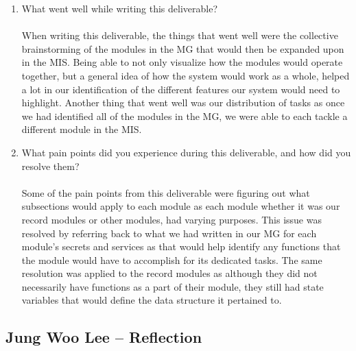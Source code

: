 \documentclass[12pt, titlepage]{article}
\begin{document}
\begin{enumerate}
  \item What went well while writing this deliverable?\\\\
  When writing this deliverable, the things that went well were the collective brainstorming
  of the modules in the MG that would then be expanded upon in the MIS. Being able to not only
  visualize how the modules would operate together, but a general idea of how the system would
  work as a whole, helped a lot in our identification of the different features our system would
  need to highlight. Another thing that went well was our distribution of tasks as once we had
  identified all of the modules in the MG, we were able to each tackle a different module in the
  MIS.
  \item What pain points did you experience during this deliverable, and how
  did you resolve them?\\\\
  Some of the pain points from this deliverable were figuring out what subsections would apply to
  each module as each module whether it was our record modules or other modules, had varying
  purposes. This issue was resolved by referring back to what we had written in our MG for each
  module's secrets and services as that would help identify any functions that the module would
  have to accomplish for its dedicated tasks. The same resolution was applied to the record
  modules as although they did not necessarily have functions as a part of their module, they still
  had state variables that would define the data structure it pertained to.
\end{enumerate}

\subsection*{Jung Woo Lee -- Reflection}
\end{document}
